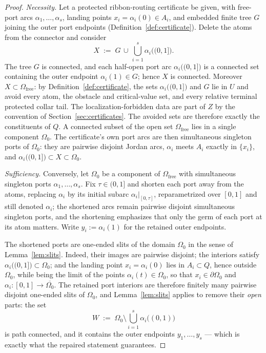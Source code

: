 \documentclass[11pt,reqno]{amsart}
\theoremstyle{definition}
\theoremstyle{remark}
\newcommand{\Omfree}{\Omega_{\mathrm{free}}}
\begin{document}
\begin{proof}
\emph{Necessity.}
Let a protected ribbon-routing certificate be given, with free-port arcs
$\alpha_1,\dots,\alpha_s$, landing points $x_i=\alpha_i(0)\in A_i$, and embedded finite
tree $G$ joining the outer port endpoints (Definition~\ref{def:certificate}). Delete the
atoms from the connector and consider
\[
X\;:=\;G\,\cup\,\bigcup_{i=1}^{s}\alpha_i\bigl((0,1]\bigr).
\]
The tree $G$ is connected, and each half-open port arc $\alpha_i\bigl((0,1]\bigr)$ is a
connected set containing the outer endpoint $\alpha_i(1)\in G$; hence $X$ is connected.
Moreover $X\subset\Omfree$: by Definition~\ref{def:certificate}, the sets
$\alpha_i\bigl((0,1]\bigr)$ and $G$ lie in $U$ and avoid every atom, the obstacle and
critical-value set, and every relative terminal protected collar tail.  The
localization-forbidden data are part of $Z$ by the convention of
Section~\ref{sec:certificates}.  The avoided sets are therefore exactly the
constituents of $Q$. A
connected subset of the open set $\Omfree$ lies in a single component $\Omega_0$. The
certificate's own port arcs are then simultaneous singleton ports of $\Omega_0$: they
are pairwise disjoint Jordan arcs, $\alpha_i$ meets $A_i$ exactly in $\{x_i\}$, and
$\alpha_i\bigl((0,1]\bigr)\subset X\subset\Omega_0$.

\emph{Sufficiency.}
Conversely, let $\Omega_0$ be a component of $\Omfree$ with simultaneous singleton ports
$\alpha_1,\dots,\alpha_s$. Fix $\tau\in(0,1]$ and shorten each port away from the atoms,
replacing $\alpha_i$ by its initial subarc $\alpha_i|_{[0,\tau]}$, reparametrized over
$[0,1]$ and still denoted $\alpha_i$; the shortened arcs remain pairwise disjoint
simultaneous singleton ports, and the shortening emphasizes that only the germ of each
port at its atom matters. Write $y_i:=\alpha_i(1)$ for the retained outer endpoints.

The shortened ports are one-ended slits of the domain $\Omega_0$ in the sense of
Lemma~\ref{lem:slits}. Indeed, their images are pairwise disjoint; the interiors satisfy
$\alpha_i\bigl((0,1]\bigr)\subset\Omega_0$; and the landing point
$x_i=\alpha_i(0)$ lies in $A_i\subset Q$, hence outside $\Omega_0$, while being the
limit of the points $\alpha_i(t)\in\Omega_0$, so that $x_i\in\partial\Omega_0$ and
$\alpha_i\colon[0,1]\to\overline{\Omega_0}$. The retained port interiors are therefore
finitely many pairwise disjoint one-ended slits of $\Omega_0$, and
Lemma~\ref{lem:slits} applies to remove their \emph{open} parts: the set
\[
W\;:=\;\Omega_0\setminus\bigcup_{i=1}^{s}\alpha_i\bigl((0,1)\bigr)
\]
is path connected, and it contains the outer endpoints $y_1,\dots,y_s$ --- which is
exactly what the repaired statement guarantees.


\end{proof}
\end{document}
